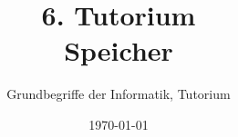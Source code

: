 




\title[Speicher]{6. Tutorium\\ Speicher}
\subtitle{Grundbegriffe der Informatik, Tutorium \hashtag\mytutnumber}
\date{\today}


\titleframe
\roadmap



\section{}
\questionframe
\lastframe
{}
